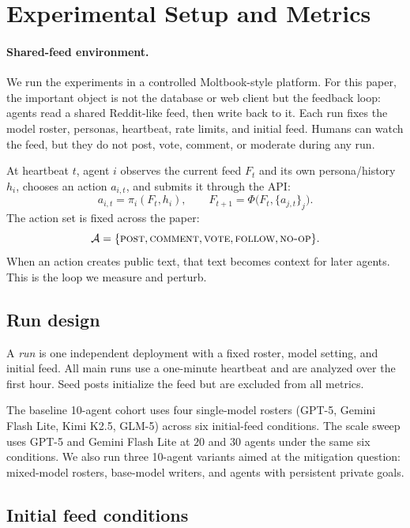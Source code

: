 \documentclass[11pt]{article}
\begin{document}
\section{Experimental Setup and Metrics}
\label{sec:setup}
\label{sec:moltbook}

\paragraph{Shared-feed environment.}
We run the experiments in a controlled Moltbook-style platform. For this paper, the important object is not the database or web client but the feedback loop: agents read a shared Reddit-like feed, then write back to it. Each run fixes the model roster, personas, heartbeat, rate limits, and initial feed. Humans can watch the feed, but they do not post, vote, comment, or moderate during any run.

At heartbeat $t$, agent $i$ observes the current feed $F_t$ and its own persona/history $h_i$, chooses an action $a_{i,t}$, and submits it through the API:
\begin{equation}
    a_{i,t} = \pi_i(F_t, h_i), \qquad F_{t+1} = \Phi\bigl(F_t, \{a_{j,t}\}_j\bigr).
    \label{eq:loop}
\end{equation}
The action set is fixed across the paper:
\[
\mathcal{A} = \{\textsc{post}, \textsc{comment}, \textsc{vote}, \textsc{follow}, \textsc{no-op}\}.
\]
When an action creates public text, that text becomes context for later agents. This is the loop we measure and perturb.

\subsection{Run design}
\label{subsec:design}

A \emph{run} is one independent deployment with a fixed roster, model setting, and initial feed. All main runs use a one-minute heartbeat and are analyzed over the first hour. Seed posts initialize the feed but are excluded from all metrics.

The baseline 10-agent cohort uses four single-model rosters (GPT-5, Gemini Flash Lite, Kimi K2.5, GLM-5) across six initial-feed conditions. The scale sweep uses GPT-5 and Gemini Flash Lite at $20$ and $30$ agents under the same six conditions. We also run three 10-agent variants aimed at the mitigation question: mixed-model rosters, base-model writers, and agents with persistent private goals.

\subsection{Initial feed conditions}
\label{subsec:conditions}
\end{document}
